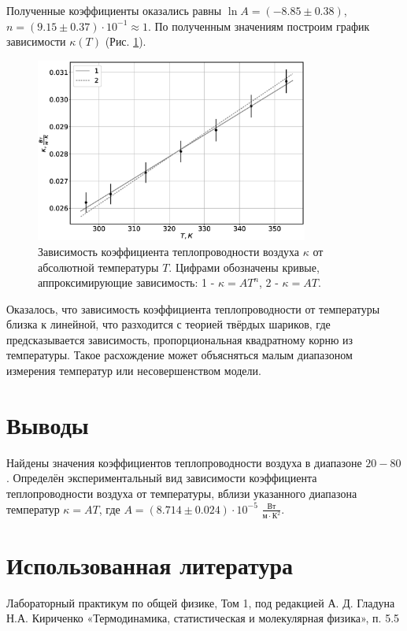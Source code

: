 \documentclass[12pt]{article}
\begin{document}
Полученные коэффициенты оказались равны \(\ln A = (-8.85 \pm 0.38)\), \(n = (9.15 \pm 0.37) \cdot 10 ^ {-1} \approx 1\). По полученным значениям 
построим график зависимости \(\kappa (T)\) (Рис. \ref{fig:kT}).  
\begin{figure}[H]
    \centering
    \includegraphics[width=0.8\textwidth]{kT.eps}
    \caption{Зависимость коэффициента теплопроводности воздуха \(\kappa \) от абсолютной температуры \(T\). Цифрами обозначены кривые, аппроксимирующие
        зависимость: 1 - \(\kappa = A T^n\), 2 - \(\kappa = A T\).}
    \label{fig:kT}
\end{figure}

Оказалось, что зависимость коэффициента теплопроводности от температуры близка к линейной, что разходится с теорией
твёрдых шариков, где предсказывается зависимость, пропорциональная квадратному корню из температуры. 
Такое расхождение может объясняться малым диапазоном измерения температур или несовершенством модели.

\section{Выводы}
Найдены значения коэффициентов теплопроводности воздуха в диапазоне \(20 - 80\) \textcelsius. Определён 
экспериментальный вид зависимости коэффициента теплопроводности воздуха от температуры, вблизи указанного 
диапазона температур \(\kappa = A T\), где \(A = (8.714 \pm 0.024) \cdot 10 ^ {-5}\) \(\frac{\textrm{Вт}}{\textrm{м} \cdot \textrm{К}^2}\).

\section{Использованная литература}
\begin{thebibliography}{9}
    Лабораторный практикум по общей физике, Том 1, под редакцией А. Д. Гладуна
    Н.А. Кириченко «Термодинамика, статистическая и молекулярная физика», п. 5.5
\end{thebibliography}
\end{document}
